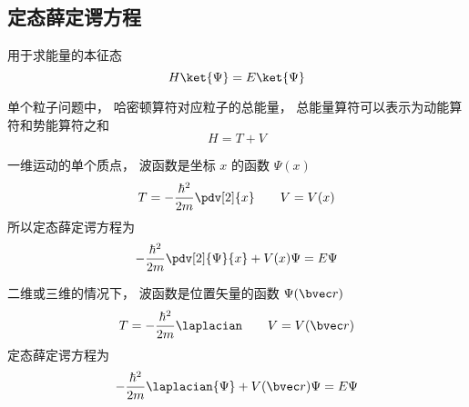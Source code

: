 

\subsection{定态薛定谔方程}
用于求能量的本征态
\begin{equation}
H \ket{\Psi} = E \ket{\Psi}
\end{equation}


单个粒子问题中， 哈密顿算符对应粒子的总能量， 总能量算符可以表示为动能算符和势能算符之和
\begin{equation}
H = T + V
\end{equation}

一维运动的单个质点， 波函数是坐标 $x$ 的函数 $\Psi(x)$
\begin{equation}
T = -\frac{\hbar^2}{2m} \pdv[2]{x} \qquad V = V(x)
\end{equation}
所以定态薛定谔方程为
\begin{equation}\label{SchEq_eq1}
-\frac{\hbar^2}{2m} \pdv[2]{\Psi}{x} + V(x)\Psi = E \Psi
\end{equation}

二维或三维的情况下， 波函数是位置矢量的函数 $\Psi(\bvec r)$
\begin{equation}
T = -\frac{\hbar^2}{2m} \laplacian \qquad V = V(\bvec r)
\end{equation}
定态薛定谔方程为
\begin{equation}
-\frac{\hbar^2}{2m} \laplacian {\Psi} + V(\bvec r)\Psi = E \Psi
\end{equation}

